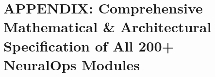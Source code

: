 \clearpage
\appendix
\section*{APPENDIX: Comprehensive Mathematical \& Architectural Specification of All 200+ NeuralOps Modules}
